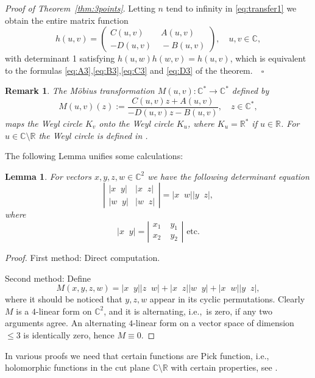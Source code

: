 \documentclass [12pt]{article}
\newtheorem{lem}[thm]{Lemma}
\newtheorem{rem}[thm]{Remark}
\newcommand{\C}{\mathbb{C}}
\newcommand{\R}{\mathbb{R}}
\begin{document}
{\it Proof of Theorem~\ref{thm:3points}}. Letting $n$ tend to infinity in \eqref{eq:transfer1} we obtain the entire matrix function
$$
h(u,v)=\left(\begin{array}{cc} C(u,v)&\; A(u,v)\\
-D(u,v)&\; -B(u,v)\end{array}\right),\quad u,v\in\mathbb
C,
$$
with determinant 1 satisfying $h(u,w)h(w,v)=h(u,v)$, which is equivalent to the formulas
\eqref{eq:A3},\eqref{eq:B3},\eqref{eq:C3} and \eqref{eq:D3} of the theorem.$\quad\square$

\begin{rem}{\rm The M\"{o}bius transformation $M(u,v):\C^*\to \C^*$ defined by 
\begin{equation*}\label{eq:mob}
M(u,v)(z):= \frac{C(u,v) z+A(u,v)}{-D(u,v)z-B(u,v)},\quad z\in\C^*,
\end{equation*}
maps the Weyl circle $K_v$ onto the Weyl circle $K_u$, where $K_u=\R^*$ if $u\in\R$. For $u\in\C\setminus\R$ the Weyl circle is defined in \cite[Section 7.3]{Sch}.} 
\end{rem}

The following Lemma unifies some calculations:
\begin{lem}\label{thm:doubledet} For vectors $x,y,z,w\in\mathbb C^2$ we have
the following determinant equation
 $$\left|\begin{array}{cc}
|x\;\;y| & |x\;\;z|\\
|w\;\;y| & |w\;\;z|\end{array}\right|=
|x\;\;w||y\;\;z|,
 $$
 where
 $$|x\;\;y|=\left|\begin{array}{cc}
x_1&\;y_1\\
x_2&\;y_2\end{array}\right|
\textrm{ etc.}
 $$
 \end{lem}

\begin{proof} First method: Direct computation.

Second method: Define
 $$M(x,y,z,w)=
|x\;\;y||z\;\;w|+|x\;\;z||w\;\;y|+
|x\;\;w||y\;\;z|,
 $$
 where it should be noticed that $y,z,w$ appear in its cyclic
permutations. Clearly $M$ is a $4$-linear form on $\mathbb C^2$,
and it is alternating, i.e.,\ is zero, if any two arguments agree. An
alternating $4$-linear form on a vector space of dimension $\leq 3$
is identically zero, hence $M\equiv0$.
\end{proof}

In various proofs we need that certain functions are Pick function, i.e., holomorphic functions in the cut plane $\C\setminus\R$ with certain properties, see \cite{Do}.
 
\end{document}
